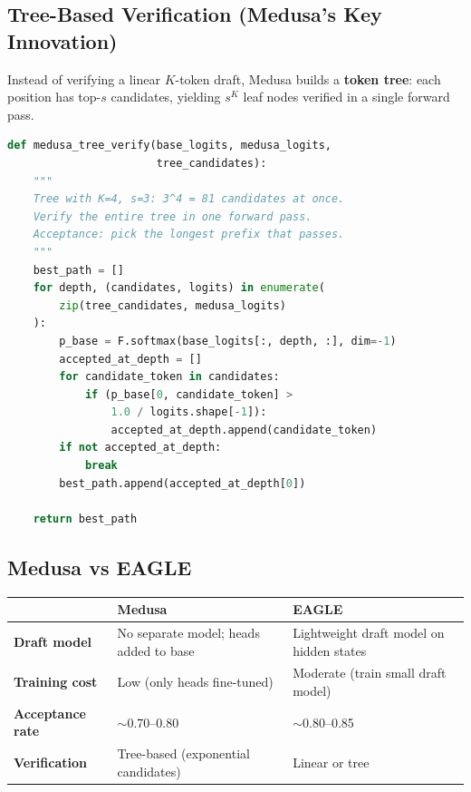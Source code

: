 \documentclass[11pt,a4paper]{article}
\begin{document}
\subsection{Tree-Based Verification (Medusa's Key Innovation)}

Instead of verifying a linear $K$-token draft, Medusa builds a \textbf{token tree}: each position has top-$s$ candidates, yielding $s^K$ leaf nodes verified in a single forward pass.

\begin{lstlisting}[language=Python, caption={Medusa Tree Verification}]
def medusa_tree_verify(base_logits, medusa_logits, 
                       tree_candidates):
    """
    Tree with K=4, s=3: 3^4 = 81 candidates at once.
    Verify the entire tree in one forward pass.
    Acceptance: pick the longest prefix that passes.
    """
    best_path = []
    for depth, (candidates, logits) in enumerate(
        zip(tree_candidates, medusa_logits)
    ):
        p_base = F.softmax(base_logits[:, depth, :], dim=-1)
        accepted_at_depth = []
        for candidate_token in candidates:
            if (p_base[0, candidate_token] > 
                1.0 / logits.shape[-1]):
                accepted_at_depth.append(candidate_token)
        if not accepted_at_depth:
            break
        best_path.append(accepted_at_depth[0])
    
    return best_path
\end{lstlisting}

\subsection{Medusa vs EAGLE}

\begin{center}
\begin{tabular}{lL{5cm}L{5cm}}
\toprule
& \textbf{Medusa} & \textbf{EAGLE} \\
\midrule
\textbf{Draft model} & No separate model; heads added to base & Lightweight draft model on hidden states \\
\textbf{Training cost} & Low (only heads fine-tuned) & Moderate (train small draft model) \\
\textbf{Acceptance rate} & $\sim$0.70--0.80 & $\sim$0.80--0.85 \\
\textbf{Verification} & Tree-based (exponential candidates) & Linear or tree \\
\bottomrule
\end{tabular}
\end{center}
\end{document}

